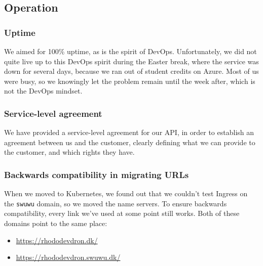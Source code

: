 \subsection{Operation}

\subsubsection{Uptime}

We aimed for 100\% uptime, as is the spirit of DevOps. Unfortunately, we did not quite live up to this DevOps spirit during the Easter break, where the service was down for several days, because we ran out of student credits on Azure. Most of us were busy, so we knowingly let the problem remain until the week after, which is not the DevOps mindset.


\subsubsection{Service-level agreement}

We have provided a service-level agreement \cite{sla:itu-minitwit} for our API, in order to establish an agreement between us and the customer, clearly defining what we can provide to the customer, and which rights they have.


\subsubsection{Backwards compatibility in migrating URLs}

When we moved to Kubernetes, we found out that we couldn't test Ingress on the \texttt{swuwu} domain, so we moved the name servers. To ensure backwards compatibility, every link we've used at some point still works.
Both of these domains point to the same place:
\begin{itemize}
    \item \url{https://rhododevdron.dk/}
    \item \url{https://rhododevdron.swuwu.dk/}
\end{itemize}
